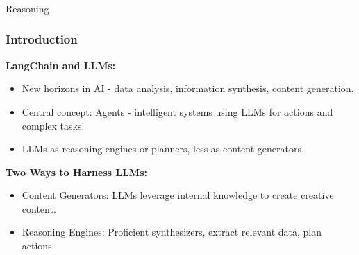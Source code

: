 \begin{frame}[fragile]\frametitle{}
\begin{center}
{\Large Reasoning}
\end{center}
\end{frame}

\begin{frame}[fragile]
\frametitle{Introduction}

\textbf{LangChain and LLMs:}
\begin{itemize}
    \item New horizons in AI - data analysis, information synthesis, content generation.
    \item Central concept: Agents - intelligent systems using LLMs for actions and complex tasks.
    \item LLMs as reasoning engines or planners, less as content generators.
\end{itemize}

\textbf{Two Ways to Harness LLMs:}
\begin{itemize}
    \item Content Generators: LLMs leverage internal knowledge to create creative content.
    \item Reasoning Engines: Proficient synthesizers, extract relevant data, plan actions.
\end{itemize}

\end{frame}

